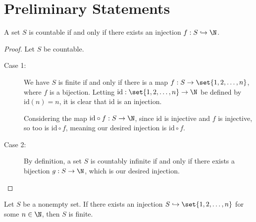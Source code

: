 \documentclass[10pt]{mypackage}
\begin{document}
\section{Preliminary Statements}%
\begin{theorem}
  A set $S$ is countable if and only if there exists an injection $f: S\hookrightarrow \N$.
\end{theorem}
\begin{proof}
  Let $S$ be countable.
  \begin{description}
    \item[Case 1:] We have $S$ is finite if and only if there is a map $f: S\rightarrow \set{1,2,\dots,n}$, where $f$ is a bijection. Letting $\text{id}: \set{1,2,\dots,n} \rightarrow \N$ be defined by $\text{id}(n) = n$, it is clear that $\text{id}$ is an injection.\newline

      Considering the map $\text{id}\circ f: S\rightarrow \N$, since $\text{id}$ is injective and $f$ is injective, so too is $\text{id}\circ f$, meaning our desired injection is $\text{id}\circ f$.
    \item[Case 2:] By definition, a set $S$ is countably infinite if and only if there exists a bijection $g: S\rightarrow \N$, which is our desired injection.
  \end{description}
\end{proof}
\begin{theorem}
  Let $S$ be a nonempty set. If there exists an injection $S\hookrightarrow \set{1,2,\dots,n}$ for some $n\in \N$, then $S$ is finite.
\end{theorem}
\end{document}
